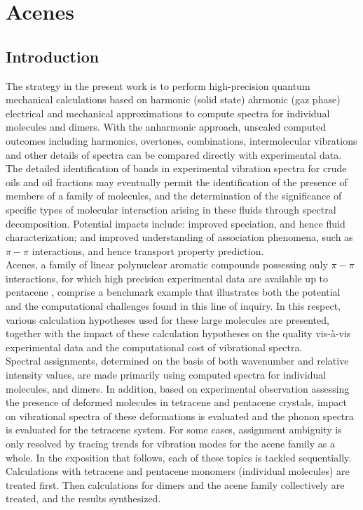 \chapter[Phonon calculation]{Acenes}
\minitoc
\restoregeometry

\newpage

\section*{Introduction}

The strategy in the present work is to perform high-precision quantum mechanical calculations based on harmonic (solid state) ahrmonic (gaz phase) electrical and mechanical approximations to compute spectra for individual molecules and dimers. With the anharmonic approach, unscaled computed outcomes including harmonics, overtones, combinations, intermolecular vibrations and other details of spectra can be compared directly with experimental data. The detailed identification of bands in experimental vibration spectra for crude oils and oil fractions may eventually permit the identification of the presence of members of a family of molecules, and the determination of the significance of specific types of molecular interaction arising in these fluids through spectral decomposition. Potential impacts include: improved speciation, and hence fluid characterization; and improved understanding of association phenomena, such as $\pi-\pi$ interactions, and hence transport property prediction.\\ 

Acenes, a family of linear polynuclear aromatic compounds possessing only $\pi-\pi$ interactions, for which high precision experimental data are available up to pentacene \cite{michaelian2012far}, comprise a benchmark example that illustrates both the potential and the computational challenges found in this line of inquiry. In this respect, various calculation hypotheses used for these large molecules are presented, together with the impact of these calculation hypotheses on the quality vis-à-vis experimental data and the computational cost of vibrational spectra.\\

Spectral assignments, determined on the basis of both wavenumber and relative intensity values, are made primarily using computed spectra for individual molecules, and dimers. In addition, based on experimental observation assessing the presence of deformed molecules in tetracene and pentacene crystals, impact on vibrational spectra of these deformations is evaluated and the phonon spectra is evaluated for the tetracene system. For some cases, assignment ambiguity is only resolved by tracing trends for vibration modes for the acene family as a whole. In the exposition that follows, each of these topics is tackled sequentially. Calculations with tetracene and pentacene monomers (individual molecules) are treated first. Then calculations for dimers and the acene family collectively are treated, and the results synthesized.


